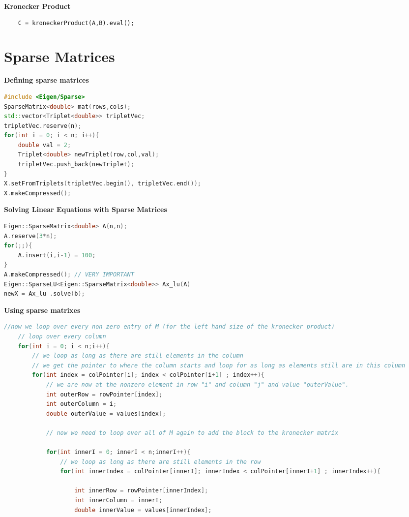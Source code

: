 \documentclass{sciposter}
\newcommand{\psection}[1]{\par \textbf{\large#1}}
\begin{document}
\begin{multicols}{2}
\psection{Kronecker Product}
\begin{lstlisting}
	C = kroneckerProduct(A,B).eval();
\end{lstlisting}


\section*{Sparse Matrices}


\psection{Defining sparse matrices}
\begin{lstlisting}[language=C++]
#include <Eigen/Sparse>
SparseMatrix<double> mat(rows,cols);
std::vector<Triplet<double>> tripletVec;
tripletVec.reserve(n);
for(int i = 0; i < n; i++){
	double val = 2;
	Triplet<double> newTriplet(row,col,val);
	tripletVec.push_back(newTriplet);
}
X.setFromTriplets(tripletVec.begin(), tripletVec.end());
X.makeCompressed();
\end{lstlisting}



\psection{Solving Linear Equations with Sparse Matrices}
\begin{lstlisting}[language=C++]
Eigen::SparseMatrix<double> A(n,n);
A.reserve(3*n);
for(;;){
	A.insert(i,i-1) = 100;
}
A.makeCompressed(); // VERY IMPORTANT
Eigen::SparseLU<Eigen::SparseMatrix<double>> Ax_lu(A) 
newX = Ax_lu .solve(b);
\end{lstlisting}


\psection{Using sparse matrixes}
\begin{lstlisting}[language=c++]
	//now we loop over every non zero entry of M (for the left hand size of the kronecker product)
	// loop over every column
	for(int i = 0; i < n;i++){
		// we loop as long as there are still elements in the column
		// we get the pointer to where the column starts and loop for as long as elements still are in this column
		for(int index = colPointer[i]; index < colPointer[i+1] ; index++){
			// we are now at the nonzero element in row "i" and column "j" and value "outerValue".
			int outerRow = rowPointer[index];
			int outerColumn = i;
			double outerValue = values[index];
			
			// now we need to loop over all of M again to add the block to the kronecker matrix
			
			for(int innerI = 0; innerI < n;innerI++){
				// we loop as long as there are still elements in the row
				for(int innerIndex = colPointer[innerI]; innerIndex < colPointer[innerI+1] ; innerIndex++){
					
					int innerRow = rowPointer[innerIndex];
					int innerColumn = innerI;
					double innerValue = values[innerIndex];
					

\end{lstlisting}
\end{multicols}
\end{document}
